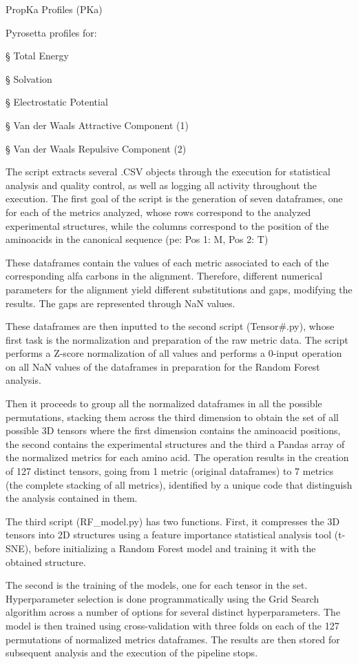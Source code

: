 \documentclass{article}
\begin{document}
PropKa Profiles (PKa)

Pyrosetta profiles for:

§ Total Energy

§ Solvation

§ Electrostatic Potential

§ Van der Waals Attractive Component (1)

§ Van der Waals Repulsive Component (2)

The script extracts several .CSV objects through the execution for statistical analysis and quality control, as well as logging all activity throughout the execution. The first goal of the script is the generation of seven dataframes, one for each of the metrics analyzed, whose rows correspond to the analyzed experimental structures, while the columns correspond to the position of the aminoacids in the canonical sequence (pe: Pos 1: M, Pos 2: T)

These dataframes contain the values of each metric associated to each of the corresponding alfa carbons in the alignment. Therefore, different numerical parameters for the alignment yield different substitutions and gaps, modifying the results. The gaps are represented through NaN values.

These dataframes are then inputted to the second script (Tensor\#.py), whose first task is the normalization and preparation of the raw metric data. The script performs a Z-score normalization of all values and performs a 0-input operation on all NaN values of the dataframes in preparation for the Random Forest analysis. 

Then it proceeds to group all the normalized dataframes in all the possible permutations, stacking them across the third dimension to obtain the set of all possible 3D tensors where the first dimension contains the aminoacid positions, the second contains the experimental structures and the third a Pandas array of the normalized metrics for each amino acid. The operation results in the creation of 127 distinct tensors, going from 1 metric (original dataframes) to 7 metrics (the complete stacking of all metrics), identified by a unique code that distinguish the analysis contained in them. 

The third script (RF\_model.py) has two functions. First, it compresses the 3D tensors into 2D structures using a feature importance statistical analysis tool (t-SNE), before initializing a Random Forest model and training it with the obtained structure. 

The second is the training of the models, one for each tensor in the set. Hyperparameter selection is done programmatically using the Grid Search algorithm across a number of options for several distinct hyperparameters. The model is then trained using cross-validation with three folds on each of the 127 permutations of normalized metrics dataframes. The results are then stored for subsequent analysis and the execution of the pipeline stops.
\end{document}
